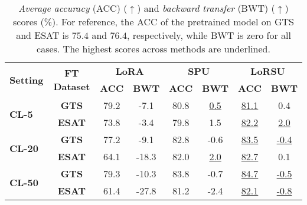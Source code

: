 \begin{table}
\caption{\emph{Average accuracy} (ACC) ($\uparrow$) and \emph{backward transfer} (BWT) ($\uparrow$) scores (\%). For reference, the ACC of the pretrained model on GTS and ESAT is $75.4$ and $76.4$, respectively, while BWT is zero for all cases. The highest scores across methods are underlined.}
\label{table:bwt_metrics_clip_reduced}
\vskip 0.15in
\begin{center}
\begin{small}
\begingroup
\setlength{\tabcolsep}{2.7pt}
\begin{tabular}{l c c c c c c c}
\toprule
\multirow{2}{*}{\textbf{Setting}} & \multirow{2}{*}{\textbf{FT Dataset}}  &  \multicolumn{2}{c}{\textbf{LoRA}} & \multicolumn{2}{c}{\textbf{SPU}} &  \multicolumn{2}{c}{\textbf{LoRSU}} \\
\cmidrule(lr){3-4} \cmidrule(lr){5-6} \cmidrule(lr){7-8} & & \textbf{ACC} & \textbf{BWT} & \textbf{ACC} & \textbf{BWT} & \textbf{ACC} & \textbf{BWT } \\
\midrule
\multirow{2}{*}{\textbf{CL-5}} & \textbf{GTS} & 79.2 & -7.1 & 80.8 & \underline{0.5} & \underline{81.1} & 0.4 \\
& \textbf{ESAT} & 73.8 & -3.4 & 79.8 & 1.5 & \underline{82.2} & \underline{2.0} \\
\midrule
\multirow{2}{*}{\textbf{CL-20}} & \textbf{GTS} & 77.2 & -9.1 & 82.8 & -0.6 & \underline{83.5} & \underline{-0.4} \\
& \textbf{ESAT} & 64.1 & -18.3 & 82.0 & \underline{2.0} & \underline{82.7} & 0.1 \\
\midrule
\multirow{2}{*}{\textbf{CL-50}} & \textbf{GTS} & 79.3 & -10.3 & 83.8 & -0.7 & \underline{84.7} & \underline{-0.5} \\
& \textbf{ESAT} & 61.4 & -27.8 & 81.2 & -2.4 & \underline{82.1} & \underline{-0.8} \\
\bottomrule
\end{tabular}
\endgroup
\end{small}
\end{center}
\vskip -0.1in
\end{table}